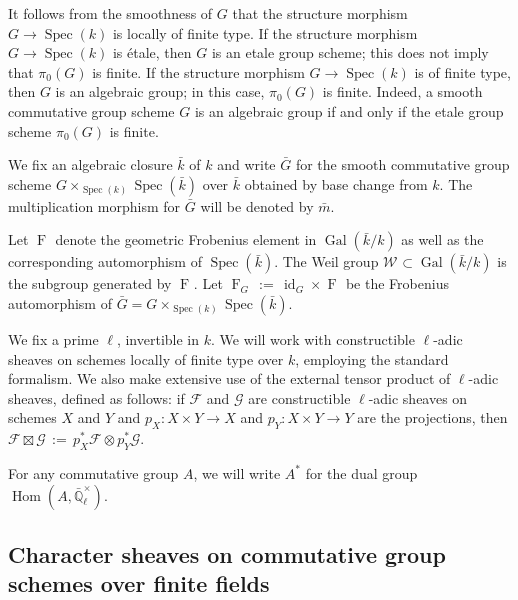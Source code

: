 \documentclass[10pt]{amsart}
\theoremstyle{plain}
\theoremstyle{definition}
\theoremstyle{remark}
\newcommand{\EE}{\mathbb{\bar Q}_\ell}
\newcommand{\bFq}{\bar{k}}
\newcommand{\Fq}{k}
\newcommand{\EEx}{\EE^\times}
\newcommand{\Weil}[1]{\mathcal{W}_{#1}}
\DeclareMathOperator{\Gal}{Gal}
\newcommand{\Frob}[1]{\operatorname{F}_{#1}}
\DeclareMathOperator{\Hom}{Hom}
\DeclareMathOperator{\id}{id}
\newcommand{\Spec}[1]{{\operatorname{Spec}(#1)}}
\newcommand{\ceq}{{\, :=\, }}
\newcommand{\bm}{\bar{m}}
\newcommand{\bG}{\bar{G}}
\begin{document}
It follows from the smoothness of $G$ that the structure morphism $G \to \Spec{\Fq}$ is locally of finite type.
If the structure morphism $G \to \Spec{\Fq}$ is \'etale, then $G$ is an etale group scheme; this does not imply that $\pi_0(G)$ is finite.
If the structure morphism $G \to \Spec{\Fq}$ is of finite type, then $G$ is an algebraic group; in this case, $\pi_0(G)$ is finite. 
Indeed, a smooth commutative group scheme $G$ is an algebraic group if and only if the etale group scheme $\pi_0(G)$ is finite.



 
We fix an algebraic closure $\bFq$ of $\Fq$ and write $\bG$ for the
smooth commutative group scheme $G \times_{\Spec{\Fq}} \Spec{\bFq}$ over $\bFq$
obtained by base change from $k$. The multiplication morphism for $\bG$ will be denoted by $\bm$.

Let $\Frob{}$ denote the geometric Frobenius element in $\Gal(\bFq/\Fq)$ as
well as the corresponding automorphism of $\Spec{\bFq}$. The Weil group
$\Weil{}\subset \Gal(\bFq/\Fq)$ is the subgroup generated by $\Frob{}$.
Let $\Frob{G} \ceq \id_{G} \times \Frob{}$ be the Frobenius automorphism of $\bG = G \times_{\Spec{\Fq}} \Spec{\bFq}$.

We fix a prime $\ell$, invertible in $\Fq$.
We will work with constructible $\ell$-adic sheaves 
on schemes locally of finite type over $\Fq$, employing the standard formalism.
We also make extensive use of the external tensor product of $\ell$-adic sheaves,
defined as follows: if $\mathcal{F}$ and $\mathcal{G}$ are constructible $\ell$-adic
sheaves on schemes $X$ and $Y$ and $p_X : X\times Y\to X$ and $p_Y : X\times Y \to Y$
are the projections, then $\mathcal{F}\boxtimes \mathcal{G} \ceq p_X^* \mathcal{F} \otimes p_Y^*\mathcal{G}$.

For any commutative group $A$, we will write $A^*$ for the dual group $\Hom(A, \EEx)$.

\subsection{Character sheaves on commutative group schemes over finite fields}\label{ssec:category}
\end{document}
